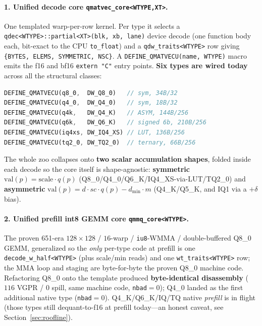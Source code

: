 \documentclass[11pt]{article}
\begin{document}
\paragraph{1. Unified decode core \texttt{qmatvec\_core<WTYPE,XT>}.} One templated warp-per-row kernel. Per type it selects a \texttt{qdec<WTYPE>::partial<XT>(blk, xb, lane)} device decode (one function body each, bit-exact to the CPU \texttt{to\_float}) and a \texttt{qdw\_traits<WTYPE>} row giving \texttt{\{BYTES, ELEMS, SYMMETRIC, NSC\}}. A \texttt{DEFINE\_QMATVECU(name, WTYPE)} macro emits the f16 and bf16 \texttt{extern "C"} entry points. \textbf{Six types are wired today} across all the structural classes:

\begin{lstlisting}[language=Rust]
DEFINE_QMATVECU(q8_0,  DW_Q8_0)   // sym, 34B/32
DEFINE_QMATVECU(q4_0,  DW_Q4_0)   // sym, 18B/32
DEFINE_QMATVECU(q4k,   DW_Q4_K)   // ASYM, 144B/256
DEFINE_QMATVECU(q6k,   DW_Q6_K)   // signed 6b, 210B/256
DEFINE_QMATVECU(iq4xs, DW_IQ4_XS) // LUT, 136B/256
DEFINE_QMATVECU(tq2_0, DW_TQ2_0)  // ternary, 66B/256
\end{lstlisting}

The whole zoo collapses onto \textbf{two scalar accumulation shapes}, folded inside each decode so the core itself is shape-agnostic: \textbf{symmetric} $\mathrm{val}(p)=\text{scale}\cdot q(p)$ (Q8\_0/Q4\_0/Q6\_K/IQ4\_XS-via-LUT/TQ2\_0) and \textbf{asymmetric} $\mathrm{val}(p)=d\cdot sc\cdot q(p)-d_{\min}\cdot m$ (Q4\_K/Q5\_K, and IQ1 via a $+\delta$ bias).

\paragraph{2. Unified prefill int8 GEMM core \texttt{qmmq\_core<WTYPE>}.} The proven 651-era $128{\times}128$ / $16$-warp / \texttt{iu8}-WMMA / double-buffered Q8\_0 GEMM, generalized so the \emph{only} per-type code at prefill is one \texttt{decode\_w\_half<WTYPE>} (plus scale/min reads) and one \texttt{wt\_traits<WTYPE>} row; the MMA loop and staging are byte-for-byte the proven Q8\_0 machine code. Refactoring Q8\_0 onto the template produced \textbf{byte-identical disassembly} ($116$ VGPR / $0$ spill, same machine code, \texttt{nbad}$=0$); Q4\_0 landed as the first additional native type (\texttt{nbad}$=0$). Q4\_K/Q6\_K/IQ/TQ native \emph{prefill} is in flight (those types still dequant-to-f16 at prefill today---an honest caveat, see Section~\ref{sec:roofline}).
\end{document}
